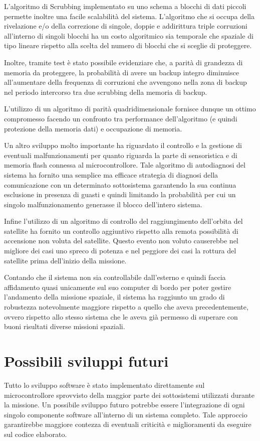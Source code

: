 \documentclass[LaM,binding=0.6cm]{../sapthesis}
\begin{document}
L'algoritmo di Scrubbing implementato su uno schema a blocchi di dati piccoli permette inoltre una facile scalabilità del sistema. L'algoritmo che
si occupa della rivelazione e/o della correzione di singole, doppie e addirittura triple corruzioni all'interno di
singoli blocchi ha un costo algoritmico sia temporale che spaziale di tipo lineare rispetto alla scelta del numero di blocchi che si sceglie di 
proteggere. 

Inoltre, tramite test è stato possibile evidenziare che, a parità di grandezza di memoria da proteggere, la probabilità di avere un backup integro diminuisce all'aumentare della frequenza di corruzioni che avvengono nella zona di backup nel periodo intercorso tra due scrubbing della memoria di backup.

L'utilizzo di un algoritmo di parità quadridimensionale fornisce dunque un ottimo compromesso facendo un confronto tra performance dell'algoritmo (e
quindi protezione della memoria dati) e occupazione di memoria.

Un altro sviluppo molto importante ha riguardato il controllo e la gestione di eventuali malfunzionamenti per quanto riguarda la parte di sensoristica 
e di memoria flash connessa al microcontrollore. Tale algoritmo di autodiagnosi del sistema ha fornito una semplice ma efficace strategia di diagnosi della comunicazione con un determinato sottosistema garantendo la sua continua esclusione in presenza di guasti e quindi limitando la probabilità per cui un singolo malfunzionamento generasse il blocco dell'intero sistema.

Infine l'utilizzo di un algoritmo di controllo del raggiungimento dell'orbita del satellite ha fornito un controllo aggiuntivo rispetto alla remota possibilità
di accensione non voluta del satellite. Questo evento non voluto causerebbe nel migliore dei casi uno spreco di potenza e nel peggiore dei casi la rottura del satellite
prima dell'inizio della missione.

Contando che il sistema non sia controllabile dall'esterno e quindi faccia affidamento quasi unicamente sul suo computer di bordo per poter gestire 
l'andamento della missione spaziale, il sistema ha raggiunto un grado di robustezza notevolmente maggiore rispetto a quello che aveva precedentemente, ovvero rispetto allo stesso sistema che le aveva già permesso di superare con buoni risultati diverse missioni spaziali.
\section{Possibili sviluppi futuri}
Tutto lo sviluppo software è stato implementato direttamente sul microcontrollore sprovvisto della maggior parte dei sottosistemi utilizzati durante la missione. Un possibile
sviluppo futuro potrebbe essere l'integrazione di ogni singolo componente software all'interno di un sistema completo. Tale approccio garantirebbe maggiore contezza
di eventuali criticità e miglioramenti da eseguire sul codice elaborato. 
\end{document}
